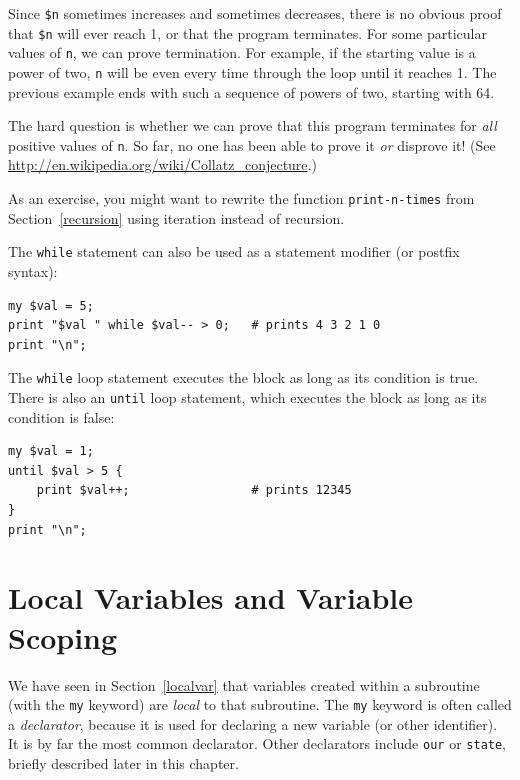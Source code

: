Since {\tt \$n} sometimes increases and sometimes decreases, there is no
obvious proof that {\tt \$n} will ever reach 1, or that the program
terminates.  For some particular values of {\tt n}, we can prove
termination.  For example, if the starting value is a power of two,
{\tt n} will be even every time through the loop
until it reaches 1. The previous example ends with such a sequence
of powers of two, starting with 64.

The hard question is whether we can prove that this program terminates
for {\em all} positive values of {\tt n}.  So far, no one has
been able to prove it {\em or} disprove it!  (See
\url{http://en.wikipedia.org/wiki/Collatz_conjecture}.)

As an exercise, you might want to rewrite the function 
\verb"print-n-times" from Section~\ref{recursion} using 
iteration instead of recursion.

The {\tt while} statement can also be used as a statement modifier (or postfix syntax):

\begin{verbatim}
my $val = 5;
print "$val " while $val-- > 0;   # prints 4 3 2 1 0
print "\n";
\end{verbatim}

The {\tt while} loop statement executes the block as long as 
its condition is true. There is also an {\tt until} loop 
statement, which executes the block as long as its condition 
is false:

\begin{verbatim}
my $val = 1;
until $val > 5 {
    print $val++;                 # prints 12345
}
print "\n";
\end{verbatim}

\section{Local Variables and Variable Scoping}

We have seen in Section~\ref{localvar} that variables created 
within a subroutine (with the {\tt my} keyword) are \emph{local} 
to that subroutine. The {\tt my} 
keyword is often called a \emph{declarator}, because it 
is used for declaring a new variable (or other identifier). 
It is by far the most common declarator. Other declarators 
include {\tt our} or {\tt state}, briefly described later 
in this chapter. 

